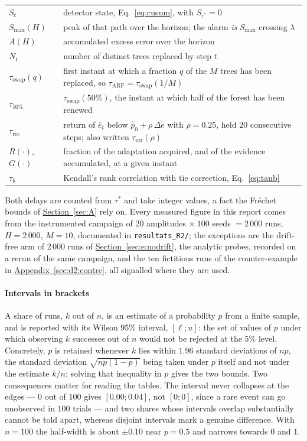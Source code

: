 \documentclass[10pt,conference]{IEEEtran}
\theoremstyle{definition}
\begin{document}
\begin{table}[t]
\begin{tabular}{@{}ll@{}}
  $S_t$ & detector state, Eq.~\eqref{eq:cusum}, with $S_{\tau^*} = 0$ \\
  $S_{\max}(H)$ & peak of that path over the horizon; the alarm \emph{is} $S_{\max}$ crossing $\lambda$ \\
  $A(H)$ & accumulated excess error over the horizon \\
  $N_t$ & number of distinct trees replaced by step $t$ \\
  $\tau_{\mathrm{swap}}(q)$ & first instant at which a fraction $q$ of the $M$ trees has been replaced, so $\tau_{\mathrm{ARF}} = \tau_{\mathrm{swap}}(1/M)$ \\
  $\tau_{50\%}$ & $\tau_{\mathrm{swap}}(50\%)$, the instant at which half of the forest has been renewed \\
  $\tau_{\mathrm{rec}}$ & return of $\bar e_t$ below $\hat p_0 + \rho\,\Delta e$ with $\rho = 0.25$, held $20$ consecutive steps; also written $\tau_{\mathrm{err}}(\rho)$ \\
  $R(\cdot)$, $G(\cdot)$ & fraction of the adaptation acquired, and of the evidence accumulated, at a given instant \\
  $\tau_b$ & Kendall's rank correlation with tie correction, Eq.~\eqref{eq:taub} \\
  \bottomrule
\end{tabular}
\end{table}

\noindent Both delays are counted from $\tau^*$ and take integer values, a fact the
Fréchet bounds of \hyperref[sec:A]{Section~\ref*{sec:A}} rely on. Every measured figure in this report comes from the
instrumented campaign of $20$ amplitudes $\times\ 100$ seeds $= 2\,000$ runs,
$H = 2\,000$, $M = 10$, documented in \texttt{resultats\_R2/}; the exceptions are the
drift-free arm of $2\,000$ runs of \hyperref[sec:e:nodrift]{Section~\ref*{sec:e:nodrift}}, the analytic probes, recorded
on a rerun of the same campaign, and the ten fictitious runs of the counter-example in
\hyperref[sec:d2:contre]{Appendix~\ref*{sec:d2:contre}}, all signalled where they are used.

\paragraph*{Intervals in brackets} A share of runs, $k$ out of $n$, is an estimate of a
probability $p$ from a finite sample, and is reported with its Wilson $95\%$ interval,
$[\ell;u]$: the set of values of $p$ under which observing $k$ successes out of $n$ would
not be rejected at the $5\%$ level. Concretely, $p$ is retained whenever $k$ lies within
$1.96$ standard deviations of $np$, the standard deviation $\sqrt{np(1-p)}$ being taken
under $p$ itself and not under the estimate $k/n$; solving that inequality in $p$ gives
the two bounds. Two consequences matter for reading the tables. The interval never
collapses at the edges --- $0$ out of $100$ gives $[0.00;0.04]$, not $[0;0]$, since a
rare event can go unobserved in $100$ trials --- and two shares whose intervals overlap
substantially cannot be told apart, whereas disjoint intervals mark a genuine difference.
With $n = 100$ the half-width is about $\pm 0.10$ near $p = 0.5$ and narrows towards
$0$ and $1$.
\end{document}
